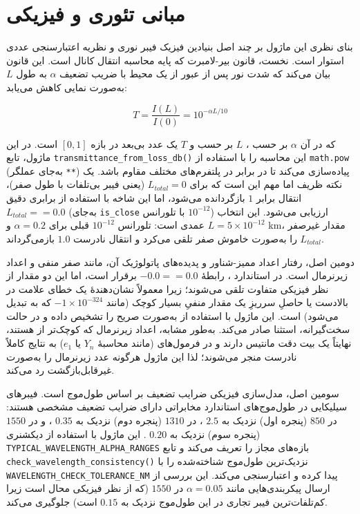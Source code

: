 \section{مبانی تئوری و فیزیکی}

بنای نظری این ماژول بر چند اصل بنیادین فیزیک فیبر نوری و نظریه اعتبارسنجی عددی استوار است. نخست، قانون بیر-لامبرت  که پایه محاسبه انتقال  کانال است. این قانون بیان می‌کند که شدت نور پس از عبور از یک محیط با ضریب تضعیف $\alpha$ به طول $L$ به‌صورت نمایی کاهش می‌یابد:

\begin{equation}
	T = \frac{I(L)}{I(0)} = 10^{-\alpha L / 10}
\end{equation}

که در آن $\alpha$ بر حسب ، $L$ بر حسب  و $T$ یک عدد بی‌بعد در بازه $[0, 1]$ است. در این ماژول، تابع \texttt{transmittance\_from\_loss\_db()} این محاسبه را با استفاده از \texttt{math.pow} (به‌جای عملگر \texttt{**}) پیاده‌سازی می‌کند تا در برابر  در پلتفرم‌های مختلف مقاوم باشد. یک نکته ظریف اما مهم این است که برای $L_{total} = 0$ (یعنی فیبر بی‌تلفات با طول صفر)، انتقال برابر $1$ بازگردانده می‌شود، اما این شاخه با استفاده از برابری دقیق $L_{total} == 0.0$ (به‌جای \texttt{is\_close} با تلورانس $10^{-12}$) ارزیابی می‌شود. این انتخاب عمدی است: تلورانس $10^{-12}$ قبلی برای $\alpha = 0.2$ و $L = 5 \times 10^{-12}$ km، مقدار غیرصفر $L_{total}$ را به‌صورت خاموش صفر تلقی می‌کرد و انتقال نادرست $1.0$ بازمی‌گرداند.

دومین اصل، رفتار اعداد ممیز-شناور  و پدیده‌های پاتولوژیک آن، مانند صفر منفی  و اعداد زیرنرمال  است. در استاندارد ، رابطهٔ $-0.0 == 0.0$ برقرار است، اما این دو مقدار از نظر فیزیکی متفاوت تلقی می‌شوند؛ زیرا  معمولاً نشان‌دهندهٔ یک خطای علامت در بالادست  یا حاصلِ سرریزِ یک مقدار منفیِ بسیار کوچک (مانند $-1 \times 10^{-324}$ که به  تبدیل می‌شود) است. این ماژول با استفاده از  به‌صورت صریح  را تشخیص داده و در حالت سخت‌گیرانه، استثنا صادر می‌کند. به‌طور مشابه، اعداد زیرنرمال  که کوچک‌تر از  هستند، نهایتاً یک بیت دقت مانتیس دارند و در فرمول‌های  (مانند محاسبهٔ $Y_n$ یا $e_1$) به نتایج کاملاً نادرست منجر می‌شوند؛ لذا این ماژول هرگونه عدد زیرنرمال را به‌صورت غیرقابل‌بازگشت رد می‌کند.


سومین اصل، مدل‌سازی فیزیکی ضرایب تضعیف بر اساس طول‌موج است. فیبرهای سیلیکایی در طول‌موج‌های استاندارد مخابراتی دارای ضرایب تضعیف مشخصی هستند: در $850$  (پنجره اول) نزدیک به $2.5$ ، در $1310$  (پنجره دوم) نزدیک به $0.35$ ، و در $1550$  (پنجره سوم) نزدیک به $0.20$ . این ماژول با استفاده از دیکشنری \texttt{TYPICAL\_WAVELENGTH\_ALPHA\_RANGES} بازه‌های مجاز را تعریف می‌کند و تابع \texttt{check\_wavelength\_consistency()} نزدیک‌ترین طول‌موج شناخته‌شده را با \texttt{WAVELENGTH\_CHECK\_TOLERANCE\_NM} پیدا کرده و اعتبارسنجی می‌کند. این بررسی از ارسال پیکربندی‌هایی مانند $\alpha = 0.05$  در $1550$  (که از نظر فیزیکی محال است زیرا کم‌تلفات‌ترین فیبر تجاری در این طول‌موج نزدیک به $0.15$  است) جلوگیری می‌کند.

